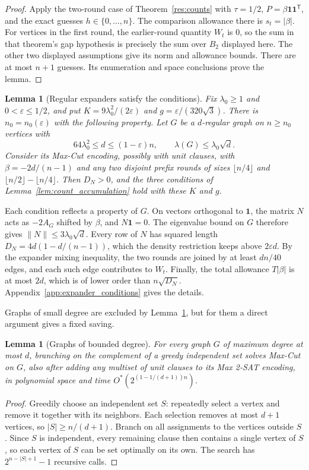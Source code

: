 \documentclass[11pt,a4paper]{article}
\newtheorem{lemma}[theorem]{Lemma}
\theoremstyle{definition}
\theoremstyle{remark}
\newcommand{\Ostar}{O^{*}}
\newcommand{\ind}{\mathbf 1}
\begin{document}
\begin{proof}
Apply the two-round case of Theorem~\ref{res:counts} with $\tau=1/2$,
$P=\beta\ind\ind^{\mathsf T}$, and the exact guesses
$h\in\{0,\ldots,n\}$.
The comparison allowance there is $s_t=|\beta|$.
For vertices in the first round, the earlier-round quantity $W_t$ is $0$,
so the sum in that theorem's gap hypothesis is precisely the sum over
$B_2$ displayed here. The other two displayed assumptions give its norm
and allowance bounds. There are at most $n+1$ guesses. Its enumeration
and space conclusions prove the lemma.
\end{proof}

\begin{lemma}[Regular expanders satisfy the conditions]\label{lem:expander_conditions}
Fix $\lambda_0\ge1$ and $0<\varepsilon\le1/2$, and put
$K=9\lambda_0^2/(2\varepsilon)$ and $g=\varepsilon/(320\sqrt3)$. There is
$n_0=n_0(\varepsilon)$ with the following property. Let $G$ be a
$d$-regular graph on $n\ge n_0$ vertices with
\[
 64\lambda_0^2\le d\le(1-\varepsilon)n,\qquad \lambda(G)\le\lambda_0\sqrt d.
\]
Consider its Max-Cut encoding, possibly with unit clauses, with
$\beta=-2d/(n-1)$ and any two disjoint prefix rounds of sizes
$\lfloor n/4\rfloor$ and $\lfloor n/2\rfloor-\lfloor n/4\rfloor$. Then
$D_N>0$, and the three conditions of Lemma~\ref{lem:count_accumulation}
hold with these $K$ and $g$.
\end{lemma}

Each condition reflects a property of $G$. On vectors orthogonal to
$\ind$, the matrix $N$ acts as $-2A_G$ shifted by $\beta$, and $N\ind=0$.
The eigenvalue bound on $G$ therefore gives $\|N\|\le3\lambda_0\sqrt d$.
Every row of $N$ has squared length $D_N=4d(1-d/(n-1))$, which the density
restriction keeps above $2\varepsilon d$. By the expander mixing
inequality, the two rounds are joined by at least $dn/40$ edges, and each
such edge contributes to $W_t$. Finally, the total allowance $T|\beta|$ is
at most $2d$, which is of lower order than $n\sqrt{D_N}$.
Appendix~\ref{app:expander_conditions} gives the details.

Graphs of small degree are excluded by
Lemma~\ref{lem:expander_conditions}, but for them a direct argument gives
a fixed saving.

\begin{lemma}[Graphs of bounded degree]\label{lem:bounded_degree}
For every graph $G$ of maximum degree at most $d$, branching on the
complement of a greedy independent set solves Max-Cut on $G$, also after
adding any multiset of unit clauses to its Max 2-SAT encoding, in
polynomial space and time $\Ostar(2^{(1-1/(d+1))n})$.
\end{lemma}
\begin{proof}
Greedily choose an independent set $S$: repeatedly select a vertex and
remove it together with its neighbors. Each selection removes at most
$d+1$ vertices, so $|S|\ge n/(d+1)$. Branch on all assignments to the
vertices outside $S$. Since $S$ is independent, every remaining clause
then contains a single vertex of $S$, so each vertex of $S$ can be set
optimally on its own. The search has $2^{n-|S|+1}-1$ recursive calls.
\end{proof}
\end{document}
